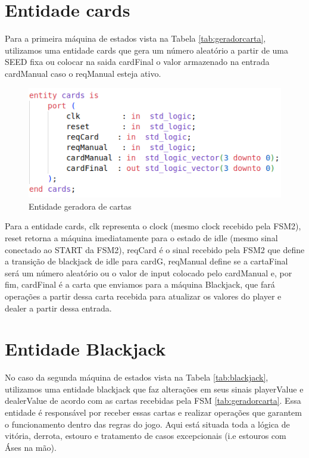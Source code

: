 \documentclass[oneside]{uffstex}
\begin{document}
\section{Entidade cards}
Para a primeira máquina de estados vista na Tabela \ref{tab:geradorcarta}, utilizamos uma entidade cards que gera um número aleatório a partir de uma SEED fixa ou colocar na saida cardFinal o valor armazenado na entrada cardManual caso o reqManual esteja ativo.
\begin{figure}[H]
    \centering
    \includegraphics[width=0.8\linewidth]{cards.png}
    \caption{Entidade geradora de cartas}
    \label{fig:cards_entity}
\end{figure}
Para a entidade cards, clk representa o clock (mesmo clock recebido pela FSM2), reset retorna a máquina imediatamente para o estado de idle (mesmo sinal conectado ao START da FSM2), reqCard é o sinal recebido pela FSM2 que define a transição de blackjack de idle para cardG, reqManual define se a cartaFinal será um número aleatório ou o valor de input colocado pelo cardManual e, por fim, cardFinal é a carta que enviamos para a máquina Blackjack, que fará operações a partir dessa carta recebida para atualizar os valores do player e dealer a partir dessa entrada.
\section{Entidade Blackjack}
No caso da segunda máquina de estados vista na Tabela \ref{tab:blackjack}, utilizamos uma entidade blackjack que faz alterações em seus sinais playerValue e dealerValue de acordo com as cartas recebidas pela FSM \ref{tab:geradorcarta}. Essa entidade é responsável por receber essas cartas e realizar operações que garantem o funcionamento dentro das regras do jogo. Aqui está situada toda a lógica de vitória, derrota, estouro e tratamento de casos excepcionais (i.e estouros com Áses na mão).
\end{document}
